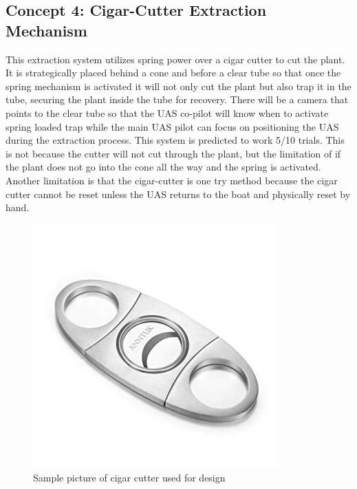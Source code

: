 \documentclass{wrcecapstone}
\begin{document}
\subsection{Concept 4: Cigar-Cutter Extraction Mechanism}
This extraction system utilizes spring power over a cigar cutter to cut the plant. It is strategically placed behind a cone and before a clear tube so that once the spring mechanism is activated it will not only cut the plant but also trap it in the tube, securing the plant inside the tube for recovery. There will be a camera that points to the clear tube so that the UAS co-pilot will know when to activate spring loaded trap while the main UAS pilot can focus on positioning the UAS during the extraction process. This system is predicted to work 5/10 trials. This is not because the cutter will not cut through  the plant, but the limitation of if the plant does not go into the cone all the way and the spring is activated. Another limitation is that the cigar-cutter is one try method because the cigar cutter cannot be reset unless the UAS returns to the boat and physically reset by hand. 
\begin{figure}
\begin{center}
\includegraphics[width=0.5\columnwidth]{figures/fig441.png}
\end{center}
\caption{Sample picture of cigar cutter used for design \cite{famoussmoke2019cigar}}
\label{fig:4.4.1}
\end{figure}
\end{document}
